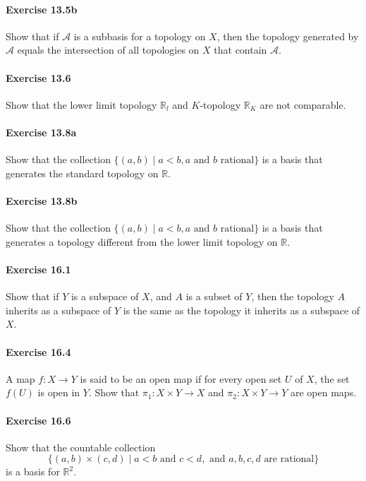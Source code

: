 \documentclass{article}
\begin{document}
\paragraph{Exercise 13.5b} Show that if $\mathcal{A}$ is a subbasis for a topology on $X$, then the topology generated by $\mathcal{A}$ equals the intersection of all topologies on $X$ that contain $\mathcal{A}$.


\paragraph{Exercise 13.6} Show that the lower limit topology $\mathbb{R}_l$ and $K$-topology $\mathbb{R}_K$ are not comparable.


\paragraph{Exercise 13.8a} Show that the collection $\{(a,b) \mid a < b, a \text{ and } b \text{ rational}\}$ is a basis that generates the standard topology on $\mathbb{R}$.


\paragraph{Exercise 13.8b} Show that the collection $\{(a,b) \mid a < b, a \text{ and } b \text{ rational}\}$ is a basis that generates a topology different from the lower limit topology on $\mathbb{R}$.


\paragraph{Exercise 16.1} Show that if $Y$ is a subspace of $X$, and $A$ is a subset of $Y$, then the topology $A$ inherits as a subspace of $Y$ is the same as the topology it inherits as a subspace of $X$.


\paragraph{Exercise 16.4} A map $f: X \rightarrow Y$ is said to be an open map if for every open set $U$ of $X$, the set $f(U)$ is open in $Y$. Show that $\pi_{1}: X \times Y \rightarrow X$ and $\pi_{2}: X \times Y \rightarrow Y$ are open maps.


\paragraph{Exercise 16.6} Show that the countable collection \[\{(a, b) \times (c, d) \mid a < b \text{ and } c < d, \text{ and } a, b, c, d \text{ are rational}\}\] is a basis for $\mathbb{R}^2$.
\end{document}
